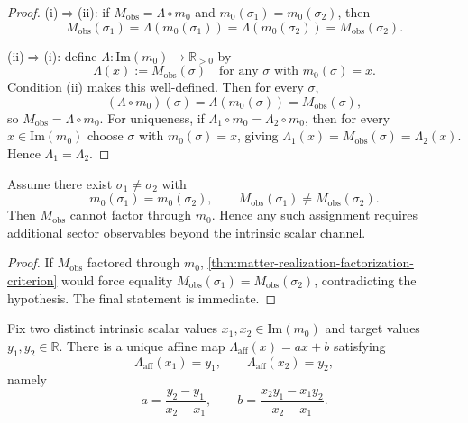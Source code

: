 \begin{proof}
\textup{(i)}\(\Rightarrow\)\textup{(ii)}:
if \(M_{\mathrm{obs}}=\Lambda\circ m_0\) and
\(m_0(\sigma_1)=m_0(\sigma_2)\), then
\[
  M_{\mathrm{obs}}(\sigma_1)
  =\Lambda(m_0(\sigma_1))
  =\Lambda(m_0(\sigma_2))
  =M_{\mathrm{obs}}(\sigma_2).
\]

\textup{(ii)}\(\Rightarrow\)\textup{(i)}:
define
\(\Lambda:\mathrm{Im}(m_0)\to\mathbb R_{>0}\)
by
\[
  \Lambda(x):=M_{\mathrm{obs}}(\sigma)
  \quad
  \text{for any }\sigma\text{ with }m_0(\sigma)=x.
\]
Condition \textup{(ii)} makes this well-defined.
Then for every \(\sigma\),
\[
  (\Lambda\circ m_0)(\sigma)=\Lambda(m_0(\sigma))=M_{\mathrm{obs}}(\sigma),
\]
so \(M_{\mathrm{obs}}=\Lambda\circ m_0\).
For uniqueness, if \(\Lambda_1\circ m_0=\Lambda_2\circ m_0\), then for
every \(x\in\mathrm{Im}(m_0)\) choose \(\sigma\) with
\(m_0(\sigma)=x\), giving
\(\Lambda_1(x)=M_{\mathrm{obs}}(\sigma)=\Lambda_2(x)\).
Hence \(\Lambda_1=\Lambda_2\).
\end{proof}

\begin{corollary}
\label{cor:matter-realization-noninjective-obstruction}
Assume there exist
\(\sigma_1\neq\sigma_2\) with
\[
  m_0(\sigma_1)=m_0(\sigma_2),
  \qquad
  M_{\mathrm{obs}}(\sigma_1)\neq M_{\mathrm{obs}}(\sigma_2).
\]
Then \(M_{\mathrm{obs}}\) cannot factor through \(m_0\).
Hence any such assignment requires additional sector observables beyond
the intrinsic scalar channel.
\end{corollary}

\begin{proof}
If \(M_{\mathrm{obs}}\) factored through \(m_0\),
\cref{thm:matter-realization-factorization-criterion} would force equality
\(M_{\mathrm{obs}}(\sigma_1)=M_{\mathrm{obs}}(\sigma_2)\), contradicting
the hypothesis.
The final statement is immediate.
\end{proof}

\begin{proposition}
\label{prop:matter-realization-affine-two-point}
Fix two distinct intrinsic scalar values
\(x_1,x_2\in\mathrm{Im}(m_0)\) and target values
\(y_1,y_2\in\mathbb R\).
There is a unique affine map
\(
  \Lambda_{\mathrm{aff}}(x)=ax+b
\)
satisfying
\[
  \Lambda_{\mathrm{aff}}(x_1)=y_1,
  \qquad
  \Lambda_{\mathrm{aff}}(x_2)=y_2,
\]
namely
\[
  a=\frac{y_2-y_1}{x_2-x_1},
  \qquad
  b=\frac{x_2y_1-x_1y_2}{x_2-x_1}.
\]
\end{proposition}

